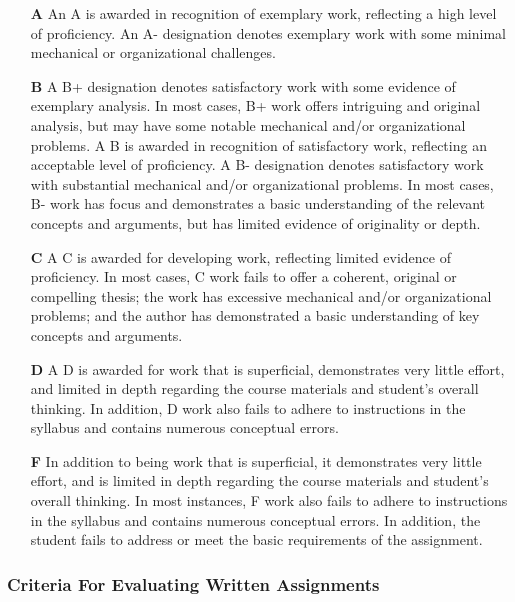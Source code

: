 \documentclass[]{article}
\begin{document}
\begin{itemize}

\item[\textbf{A}] An A is awarded in recognition of exemplary work, reflecting
a high level of proficiency. An A- designation denotes exemplary work with some
minimal mechanical or organizational challenges.

\item[\textbf{B}] A B+ designation denotes satisfactory work with some evidence
of exemplary analysis. In most cases, B+ work offers intriguing and original
analysis, but may have some notable mechanical and/or organizational problems.
A B is awarded in recognition of satisfactory work, reflecting an acceptable
level of proficiency. A B- designation denotes satisfactory work with
substantial mechanical and/or organizational problems. In most cases, B- work
has focus and demonstrates a basic understanding of the relevant concepts and
arguments, but has limited evidence of originality or depth.

\item[\textbf{C}] A C is awarded for developing work, reflecting limited
evidence of proficiency. In most cases, C work fails to offer a coherent,
original or compelling thesis; the work has excessive mechanical and/or
organizational problems; and the author has demonstrated a basic understanding
of key concepts and arguments.

\item[\textbf{D}] A D is awarded for work that is superficial, demonstrates
very little effort, and limited in depth regarding the course materials and
student’s overall thinking. In addition, D work also fails to adhere to
instructions in the syllabus and contains numerous conceptual errors.

\item[\textbf{F}] In addition to being work that is superficial, it
demonstrates very little effort, and is limited in depth regarding the course
materials and student’s overall thinking. In most instances, F work also fails
to adhere to instructions in the syllabus and contains numerous conceptual
errors. In addition, the student fails to address or meet the basic
requirements of the assignment.

\end{itemize}

\subsubsection{Criteria For Evaluating Written
Assignments}\label{criteria-for-evaluating-written-assignments}
\end{document}
